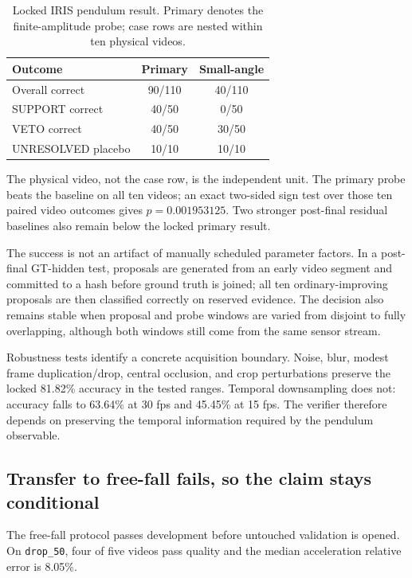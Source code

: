 \documentclass[acmtog]{acmart}
\begin{document}
\begin{table}[t]
\centering
\caption{Locked IRIS pendulum result. Primary denotes the finite-amplitude probe; case rows are nested within ten physical videos.}
\label{tab:iris-pendulum}
\small
\begin{tabularx}{\linewidth}{@{}Xcc@{}}
\toprule
Outcome & Primary & Small-angle \\
\midrule
Overall correct & 90/110 & 40/110 \\
SUPPORT correct & 40/50 & 0/50 \\
VETO correct & 40/50 & 30/50 \\
UNRESOLVED placebo & 10/10 & 10/10 \\
\bottomrule
\end{tabularx}
\end{table}

The physical video, not the case row, is the independent unit. The primary probe beats the baseline on all ten videos; an exact two-sided sign test over those ten paired video outcomes gives \(p=0.001953125\). Two stronger post-final residual baselines also remain below the locked primary result.

The success is not an artifact of manually scheduled parameter factors. In a post-final GT-hidden test, proposals are generated from an early video segment and committed to a hash before ground truth is joined; all ten ordinary-improving proposals are then classified correctly on reserved evidence. The decision also remains stable when proposal and probe windows are varied from disjoint to fully overlapping, although both windows still come from the same sensor stream.

Robustness tests identify a concrete acquisition boundary. Noise, blur, modest frame duplication/drop, central occlusion, and crop perturbations preserve the locked 81.82\% accuracy in the tested ranges. Temporal downsampling does not: accuracy falls to 63.64\% at 30 fps and 45.45\% at 15 fps. The verifier therefore depends on preserving the temporal information required by the pendulum observable.

\subsection{Transfer to free-fall fails, so the claim stays conditional}\label{second-domain-iris-freefall-failure}

The free-fall protocol passes development before untouched validation is opened. On \texttt{drop\_50}, four of five videos pass quality and the median acceleration relative error is 8.05\%.
\end{document}
